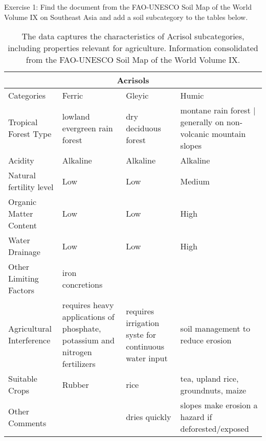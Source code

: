 Exercise 1: Find the document from the FAO-UNESCO Soil Map of the World Volume IX on Southeast Asia and add a soil subcategory to the tables below.

\begin{table}
  \caption{The data captures the characteristics of Acrisol subcategories, including properties relevant for agriculture. Information consolidated from the FAO-UNESCO Soil Map of the World Volume IX.}
\begin{center}
  \begin{tabular}{ | p{3.5cm} | p{3.5cm} | p{3.5cm} | p{3.5cm} |}
    \hline
    \multicolumn{4}{|c|}{Acrisols} \\
    \hline
    Categories & Ferric & Gleyic & Humic \\ \hline
    Tropical Forest Type & lowland evergreen rain forest & dry deciduous forest & montane rain forest | generally on non-volcanic mountain slopes\\ \hline
    Acidity & Alkaline & Alkaline &  Alkaline \\ \hline
    Natural fertility level & Low & Low & Medium \\ \hline
    Organic Matter Content & Low & Low & High \\ \hline
    Water Drainage & Low & Low & High \\ \hline
    Other Limiting Factors & iron concretions & &\\ \hline
    Agricultural Interference & requires heavy applications of phosphate, potassium and nitrogen fertilizers & requires irrigation syste for continuous water input & soil management to reduce erosion\\ \hline
    Suitable Crops & Rubber & rice & tea, upland rice, groundnuts, maize \\ \hline
    Other Comments & & dries quickly & slopes make erosion a hazard if deforested/exposed\\ 
    \hline
    \end{tabular}
		\end{center}
\end{table}
 
